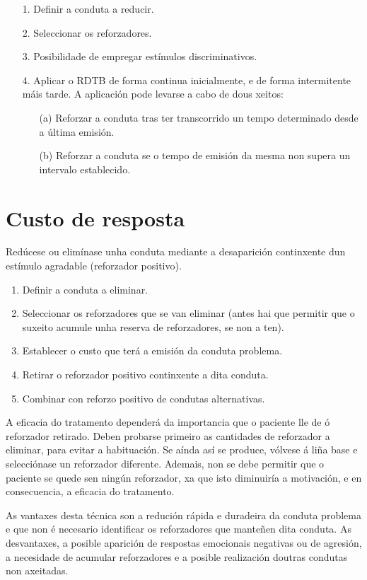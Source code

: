 \documentclass[a4paper,11pt]{article}
\begin{document}
\begin{itemize}
\begin{itemize}
		\item[1.] Definir a conduta a reducir.
		\item[2.] Seleccionar os reforzadores.
		\item[3.] Posibilidade de empregar estímulos discriminativos.
		\item[4.] Aplicar o RDTB de forma continua inicialmente, e de forma intermitente máis tarde. 
		A aplicación pode levarse a cabo de dous xeitos:
		\begin{itemize}
			\item[(a)] Reforzar a conduta tras ter transcorrido un tempo determinado desde a última 
			emisión.
			\item[(b)] Reforzar a conduta se o tempo de emisión da mesma non supera un intervalo 
			establecido.
		\end{itemize}
	\end{itemize}
\end{itemize}

\section{Custo de resposta}
Redúcese ou elimínase unha conduta mediante a desaparición continxente dun estímulo agradable (reforzador positivo).
\begin{enumerate}
	\item Definir a conduta a eliminar.
	\item Seleccionar os reforzadores que se van eliminar (antes hai que permitir que o suxeito 
	acumule unha reserva de reforzadores, se non a ten).
	\item Establecer o custo que terá a emisión da conduta problema.
	\item Retirar o reforzador positivo continxente a dita conduta.
	\item Combinar con reforzo positivo de condutas alternativas.
\end{enumerate}

A eficacia do tratamento dependerá da importancia que o paciente lle de ó reforzador retirado. Deben probarse primeiro as cantidades de reforzador a eliminar, para evitar a habituación. Se aínda así se produce, vólvese á liña base e selecciónase un reforzador diferente. Ademais, non se debe permitir que o paciente se quede sen ningún reforzador, xa que isto diminuiría a motivación, e en consecuencia, a eficacia do tratamento.

As vantaxes desta técnica son a redución rápida e duradeira da conduta problema e que non é necesario identificar os reforzadores que manteñen dita conduta. As desvantaxes, a posible aparición de respostas emocionais negativas ou de agresión, a necesidade de acumular reforzadores e a posible realización doutras condutas non axeitadas. 
\end{document}
